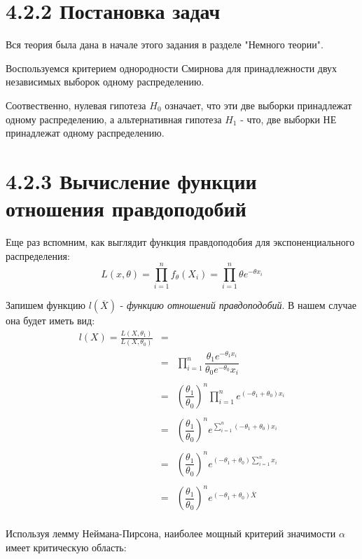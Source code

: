 \documentclass[a4paper,12pt, oneside]{book}
\begin{document}
\section{4.2.2 Постановка задач}

Вся теория была дана в начале этого задания в разделе "Немного теории". 
	
Воспользуемся критерием однородности Смирнова для принадлежности двух независимых выборок одному распределению.

Соотвественно,  нулевая гипотеза $ H_0 $ означает, что эти две выборки принадлежат одному распределению, а альтернативная гипотеза $ H_1 $ - что, две выборки НЕ принадлежат одному распределению.

\section{4.2.3 Вычисление функции отношения правдоподобий}

Еще раз вспомним, как выглядит функция правдоподобия для экспоненциального распределения:
$$
L(x, \theta) = \prod\limits_{i = 1}^n f_\theta(X_i) = \prod\limits_{i = 1}^n \theta e^{-\theta x_i}
$$

Запишем функцию $ l(\overline{X}) $  - \textit{функцию отношений правдоподобий}. В нашем случае она будет иметь вид:
$$
\begin{array}{rcl}
l(X) = \frac{L(X, \theta_1)}{L(X, \theta_0 )}  & = \\
& = &  \prod\limits_{i = 1}^n \dfrac{\theta_1 e^{-\theta_1 x_i}}{\theta_0 e^{-\theta_0} x_i} \\
\\
& = & \left( \dfrac{\theta_1}{\theta_0}\right)^n \prod\limits_{i = 1}^n e^{(-\theta_1 + \theta_0)x_i}\\
\\
& = &  \left( \dfrac{\theta_1}{\theta_0}\right)^n e^{\sum\limits_{i = 1}^n (-\theta_1 + \theta_0) x_i}\\
\\
& = & \left( \dfrac{\theta_1}{\theta_0}\right)^n e^{(-\theta_1 + \theta_0) \sum\limits_{i = 1}^n x_i}\\
\\
& = & \left( \dfrac{\theta_1}{\theta_0}\right)^n e^{(-\theta_1 + \theta_0) \overline{X}}\\
\end{array}
$$

Используя лемму Неймана-Пирсона, наиболее мощный критерий значимости $ \alpha  $ имеет критическую область:
\end{document}
